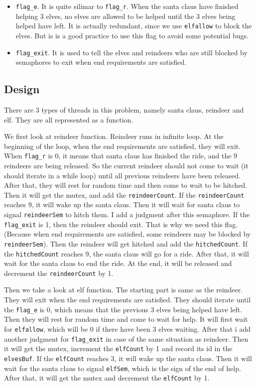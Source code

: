 \begin{itemize}
    \item \texttt{flag\_e}. It is quite silimar to \texttt{flag\_r}. When the santa claus have finished helping 3 elves, no elves are allowed to be helped until the 3 elves being helped have left. It is actually redundant, since we use \texttt{elfallow} to block the elves. But is is a good practice to use this flag to avoid some potential bugs.
    \item \texttt{flag\_exit}. It is used to tell the elves and reindeers who are still blocked by semaphores to exit when end requirements are satisfied. 
\end{itemize}

\subsection{Design}
There are 3 types of threads in this problem, namely santa claus, reindeer and elf. They are all represented as a function.

We first look at reindeer function. Reindeer runs in infinite loop. At the beginning of the loop, when the end requirements are satisfied, they will exit. When \texttt{flag\_r} is 0, 
it means that santa claus has finished the ride, and the 9 reindeers are being released. So the current reindeer should not come to wait (it should iterate in a while loop) until all previous reindeers have been released.
After that, they will rest for random time and then come to wait to be hitched. Then it will get the mutex, and add the \texttt{reindeerCount}. If the \texttt{reindeerCount} reaches 9, it will wake up the santa claus. 
Then it will wait for santa claus to signal \texttt{reindeerSem} to hitch them. I add a judgment after this semaphore. If the \texttt{flag\_exit} is 1, then the reindeer should exit. That is why we need this flag. (Because when end requirements are satisfied, some reindeers may be blocked by \texttt{reindeerSem}).
Then the reindeer will get hitched and add the \texttt{hitchedCount}. If the \texttt{hitchedCount} reaches 9, the santa claus will go for a ride. After that, it will wait for the santa claus to end the ride. At the end, it will be released and decrement the \texttt{reindeerCount} by 1.

Then we take a look at elf function. The starting part is same as the reindeer. They will exit when the end requirements are satisfied. They should iterate until the \texttt{flag\_e} is 0, which means that the previous 3 elves being helped have left. 
Then they will rest for random time and come to wait for help. It will first wait for \texttt{elfallow}, which will be 0 if there have been 3 elves waiting. After that i add another judgment for \texttt{flag\_exit} in case of the same situation as reindeer. 
Then it will get the mutex, increment the \texttt{elfCount} by 1 and record its id in the \texttt{elvesBuf}. If the \texttt{elfCount} reaches 3, it will wake up the santa claus. Then it will wait for the santa claus to signal \texttt{elfSem}, which is the sign of the end of help.
After that, it will get the mutex and decrement the \texttt{elfCount} by 1.

